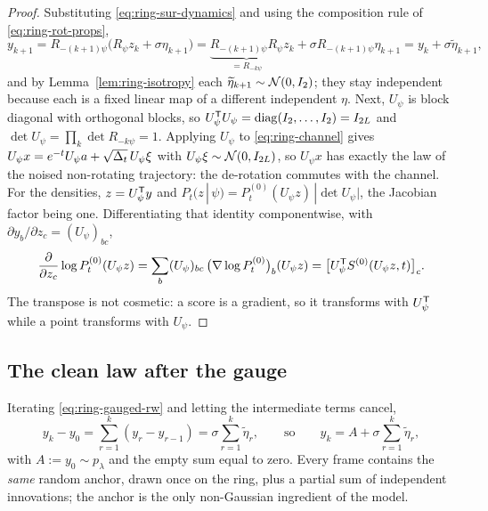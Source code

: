 \begin{proof}
Substituting \eqref{eq:ring-sur-dynamics} and using the composition rule of
\eqref{eq:ring-rot-props},
\begin{equation*}
  y_{k+1}
  = R_{-(k+1)\psi}\big(R_\psi z_k + \sigma\eta_{k+1}\big)
  = \underbrace{R_{-(k+1)\psi}R_\psi}_{= R_{-k\psi}} z_k
    + \sigma R_{-(k+1)\psi}\eta_{k+1}
  = y_k + \sigma\widetilde\eta_{k+1} ,
\end{equation*}
and by Lemma~\ref{lem:ring-isotropy} each
$\widetilde\eta_{k+1} \sim \mathcal{N}(0,I_2)$; they stay independent because each is a
fixed linear map of a different independent $\eta$. Next, $U_\psi$ is block
diagonal with orthogonal blocks, so
$U_\psi^{\mathsf{T}} U_\psi = \mathrm{diag}(I_2, \dots, I_2) = I_{2L}$ and
$\det U_\psi = \prod_k \det R_{-k\psi} = 1$. Applying $U_\psi$ to
\eqref{eq:ring-channel} gives
$U_\psi x = e^{-t} U_\psi a + \sqrt{\Delta_t}\, U_\psi \xi$ with
$U_\psi \xi \sim \mathcal{N}(0, I_{2L})$, so $U_\psi x$ has exactly the law of the
noised non-rotating trajectory: the de-rotation commutes with the channel. For
the densities, $z = U_\psi^{\mathsf{T}} y$ and
$P_t(z\,|\,\psi) = P^{(0)}_t(U_\psi z)\,|\det U_\psi|$, the Jacobian factor
being one. Differentiating that identity componentwise, with
$\partial y_b/\partial z_c = (U_\psi)_{bc}$,
\begin{equation*}
  \frac{\partial}{\partial z_c} \log P^{(0)}_t(U_\psi z)
  = \sum_b (U_\psi)_{bc}\,
    \big(\nabla \log P^{(0)}_t\big)_b (U_\psi z)
  = \big[ U_\psi^{\mathsf{T}} S^{(0)}(U_\psi z, t) \big]_c .
\end{equation*}
The transpose is not cosmetic: a score is a gradient, so it transforms with
$U_\psi^{\mathsf{T}}$ while a point transforms with $U_\psi$.
\end{proof}

\subsection{The clean law after the gauge}

Iterating \eqref{eq:ring-gauged-rw} and letting the intermediate terms cancel,
\begin{equation}
  y_k - y_0 = \sum_{r=1}^{k} (y_r - y_{r-1})
            = \sigma \sum_{r=1}^{k} \widetilde\eta_r ,
  \qquad\text{so}\qquad
  y_k = A + \sigma \sum_{r=1}^{k} \widetilde\eta_r ,
  \label{eq:ring-unrolled}
\end{equation}
with $A := y_0 \sim p_\lambda$ and the empty sum equal to zero. Every frame
contains the \emph{same} random anchor, drawn once on the ring, plus a partial
sum of independent innovations; the anchor is the only non-Gaussian ingredient
of the model.

